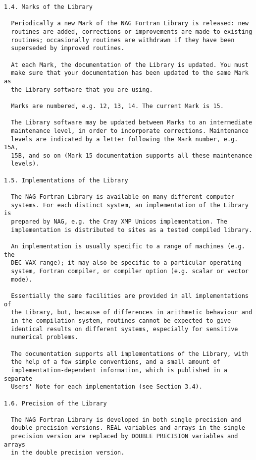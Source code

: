 \begin{verbatim}
1.4. Marks of the Library
 
  Periodically a new Mark of the NAG Fortran Library is released: new
  routines are added, corrections or improvements are made to existing
  routines; occasionally routines are withdrawn if they have been
  superseded by improved routines.
 
  At each Mark, the documentation of the Library is updated. You must
  make sure that your documentation has been updated to the same Mark as
  the Library software that you are using.
 
  Marks are numbered, e.g. 12, 13, 14. The current Mark is 15.
 
  The Library software may be updated between Marks to an intermediate
  maintenance level, in order to incorporate corrections. Maintenance
  levels are indicated by a letter following the Mark number, e.g. 15A,
  15B, and so on (Mark 15 documentation supports all these maintenance
  levels).
 
1.5. Implementations of the Library
 
  The NAG Fortran Library is available on many different computer
  systems. For each distinct system, an implementation of the Library is
  prepared by NAG, e.g. the Cray XMP Unicos implementation. The
  implementation is distributed to sites as a tested compiled library.
 
  An implementation is usually specific to a range of machines (e.g. the
  DEC VAX range); it may also be specific to a particular operating
  system, Fortran compiler, or compiler option (e.g. scalar or vector
  mode).
 
  Essentially the same facilities are provided in all implementations of
  the Library, but, because of differences in arithmetic behaviour and
  in the compilation system, routines cannot be expected to give
  identical results on different systems, especially for sensitive
  numerical problems.
 
  The documentation supports all implementations of the Library, with
  the help of a few simple conventions, and a small amount of
  implementation-dependent information, which is published in a separate
  Users' Note for each implementation (see Section 3.4).
 
1.6. Precision of the Library
 
  The NAG Fortran Library is developed in both single precision and
  double precision versions. REAL variables and arrays in the single
  precision version are replaced by DOUBLE PRECISION variables and arrays
  in the double precision version.
 

\end{verbatim}
